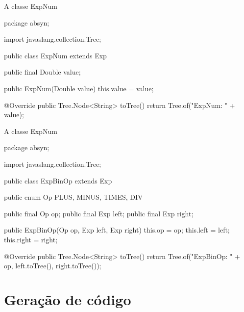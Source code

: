 \begin{frame}{A classe ExpNum}
\begin{pygmented}[]
package absyn;

import javaslang.collection.Tree;

public class ExpNum extends Exp {

   public final Double value;

   public ExpNum(Double value) {
      this.value = value;
   }

   @Override
   public Tree.Node<String> toTree() {
      return Tree.of("ExpNum: " + value);
   }
}
\end{pygmented}
\end{frame}

\begin{frame}{A classe ExpNum}
  \scriptsize
\begin{pygmented}[]
package absyn;

import javaslang.collection.Tree;

public class ExpBinOp extends Exp {

   public enum Op {PLUS, MINUS, TIMES, DIV}

   public final Op op;
   public final Exp left;
   public final Exp right;

   public ExpBinOp(Op op, Exp left, Exp right) {
      this.op = op;
      this.left = left;
      this.right = right;
   }

   @Override
   public Tree.Node<String> toTree() {
      return Tree.of("ExpBinOp: " + op,
                     left.toTree(),
                     right.toTree());
   }
}
\end{pygmented}
\end{frame}


\section{Geração de código}

